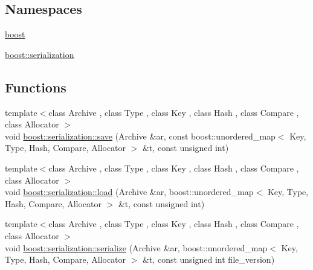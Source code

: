 \subsection*{Namespaces}
\begin{DoxyCompactItemize}
\item 
\hyperlink{namespaceboost}{boost}
\item 
\hyperlink{namespaceboost_1_1serialization}{boost\-::serialization}
\end{DoxyCompactItemize}
\subsection*{Functions}
\begin{DoxyCompactItemize}
\item 
{\footnotesize template$<$class Archive , class Type , class Key , class Hash , class Compare , class Allocator $>$ }\\void \hyperlink{namespaceboost_1_1serialization_a04a81556a5eda4b2ee2aea89fa8bacab}{boost\-::serialization\-::save} (Archive \&ar, const boost\-::unordered\-\_\-map$<$ Key, Type, Hash, Compare, Allocator $>$ \&t, const unsigned int)
\item 
{\footnotesize template$<$class Archive , class Type , class Key , class Hash , class Compare , class Allocator $>$ }\\void \hyperlink{namespaceboost_1_1serialization_a8d4be56406f8947db1a1accf28c7e046}{boost\-::serialization\-::load} (Archive \&ar, boost\-::unordered\-\_\-map$<$ Key, Type, Hash, Compare, Allocator $>$ \&t, const unsigned int)
\item 
{\footnotesize template$<$class Archive , class Type , class Key , class Hash , class Compare , class Allocator $>$ }\\void \hyperlink{namespaceboost_1_1serialization_a38423d04b011754810c08d6e599f4789}{boost\-::serialization\-::serialize} (Archive \&ar, boost\-::unordered\-\_\-map$<$ Key, Type, Hash, Compare, Allocator $>$ \&t, const unsigned int file\-\_\-version)
\end{DoxyCompactItemize}
